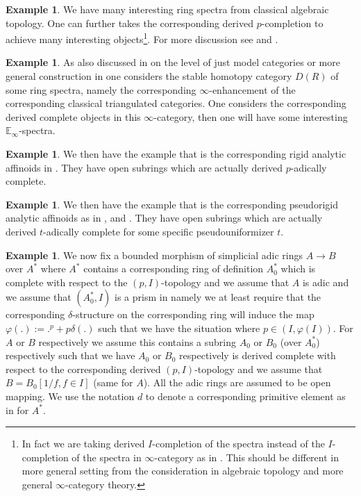 \documentclass[11pt]{book}
\theoremstyle{definition}
\numberwithin{equation}{section}
\newtheorem{example}[theorem]{Example}
\begin{document}
\begin{example}
We have many interesting ring spectra from classical algebraic topology. One can further takes the corresponding derived $p$-completion to achieve many interesting objects\footnote{In fact we are taking derived $I$-completion of the spectra instead of the $I$-completion of the spectra in $\infty$-category as in \cite[Chapter 7.3]{12Lu2}. This should be different in more general setting from the consideration in algebraic topology and more general $\infty$-category theory.}. For more discussion see \cite[Chapter 5-13]{12MP} and \cite{12N}.	
\end{example}


\begin{example}
As also discussed in \cite[Chapter 14-19]{12MP} on the level of just model categories or more general construction in \cite[Chapter 1.3]{12Lu1} one considers the stable homotopy category $D(R)$ of some ring spectra, namely the corresponding $\infty$-enhancement of the corresponding classical triangulated categories. One considers the corresponding derived complete objects in this $\infty$-category, then one will have some interesting $\mathbb{E}_\infty$-spectra. 	
\end{example}




\begin{example}
We then have the example that is the corresponding rigid analytic affinoids in \cite[Definition 4.1]{12Ta}. They have open subrings which are actually derived $p$-adically complete.	
\end{example}


\begin{example}
We then have the example that is the corresponding pseudorigid analytic affinoids as in \cite[Definition 3.1]{12Bel1},  \cite{12Bel2} and \cite[Definition 4.1]{12L}. They have open subrings which are actually derived $t$-adically complete for some specific pseudouniformizer $t$.
\end{example}


\begin{example}
We now fix a bounded morphism of simplicial adic rings $A\rightarrow B$ over $A^*$ where $A^*$ contains a corresponding ring of definition $A^*_0$ which is complete with respect to the $(p,I)$-topology and we assume that $A$ is adic and we assume that $(A^*_0,I)$ is a prism in \cite{12BS} namely we at least require that the corresponding $\delta$-structure on the corresponding ring will induce the map $\varphi(.):=.^p+p\delta(.)$ such that we have the situation where $p\in (I,\varphi(I))$. For $A$ or $B$ respectively we assume this contains a subring $A_0$ or $B_0$ (over $A_0^*$) respectively such that we have $A_0$ or $B_0$ respectively is derived complete with respect to the corresponding derived $(p,I)$-topology and we assume that $B=B_0[1/f,f\in I]$ (same for $A$). All the adic rings are assumed to be open mapping. We use the notation $d$ to denote a corresponding primitive element as in \cite[Section 2.3]{12BS} for $A^*$. 
\end{example}
\end{document}

